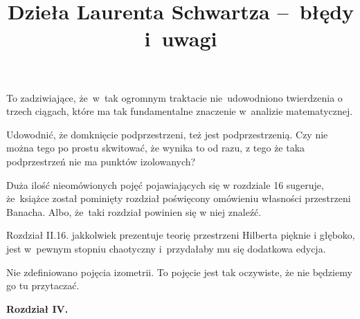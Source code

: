 \documentclass[a4paper,11pt]{article}
\title{Dzieła Laurenta Schwartza --~błędy i~uwagi}
\begin{document}



\maketitle %








\start To zadziwiające, że~w~tak ogromnym traktacie nie~udowodniono
twierdzenia o trzech ciągach, które ma tak fundamentalne znaczenie
w~analizie matematycznej.

\vspace{\spaceFour}


\start Udowodnić, że domknięcie podprzestrzeni, też jest
podprzestrzenią. Czy nie można tego po prostu skwitować, że wynika to
od razu, z tego że taka podprzestrzeń nie ma punktów izolowanych?

\vspace{\spaceFour}

\start Duża ilość nieomówionych pojęć pojawiających się w rozdziale 16
sugeruje, że~książce został pominięty rozdział poświęcony omówieniu
własności przestrzeni Banacha. Albo, że~taki rozdział powinien się w
niej znaleźć.

\vspace{\spaceFour}


\start Rozdział II.16. jakkolwiek prezentuje teorię przestrzeni
Hilberta pięknie i głęboko, jest w~pewnym stopniu chaotyczny
i~przydałaby mu się dodatkowa edycja.

\vspace{\spaceFour}


\start Nie zdefiniowano pojęcia izometrii. To pojęcie jest tak
oczywiste, że nie będziemy go tu przytaczać.

\vspace{\spaceTwo}

\noi \textbf{Rozdział IV.}

\vspace{\spaceThree}
\end{document}
